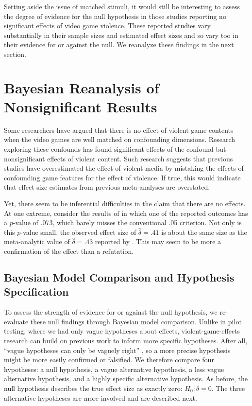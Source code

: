 \documentclass[man]{apa6}
\begin{document}
Setting aside the issue of matched stimuli, it would still be interesting to assess the degree of evidence for the null hypothesis in those studies reporting no significant effects of video game violence. These reported studies vary substantially in their sample sizes and estimated effect sizes and so vary too in their evidence for or against the null. We reanalyze these findings in the next section.

\section{Bayesian Reanalysis of Nonsignificant Results}
Some researchers have argued that there is no effect of violent game contents when the video games are well matched on confounding dimensions. Research exploring these confounds has found significant effects of the confound but nonsignificant effects of violent content. Such research suggests that previous studies have overestimated the effect of violent media by mistaking the effects of confounding game features for the effect of violence. If true, this would indicate that effect size estimates from previous meta-analyses \citep[e.g., $r = .21$ or $d = 0.43$,][]{Anderson:etal:2010} are overstated.  

Yet, there seem to be inferential difficulties in the claim that there are no effects.  At one extreme, consider the results of \citet{Elson:etal:2013} in which one of the reported outcomes has a $p$-value of .073, which barely misses the conventional .05 criterion.  Not only is this $p$-value small, the observed effect size of $\hat{\delta}=.41$ is about the same size as the meta-analytic value of $\hat{\delta}=.43$ reported by \citet{Anderson:etal:2010}.  This may seem to be more a confirmation of the effect than a refutation.

\subsection{Bayesian Model Comparison and Hypothesis Specification}
To assess the strength of evidence for or against the null hypothesis, we re-evaluate these null findings through Bayesian model comparison. Unlike in pilot testing, where we had only vague hypotheses about effects, violent-game-effects research can build on previous work to inform more specific hypotheses. After all, ``vague hypotheses can only be vaguely right'' \citep[p. 4]{Gallistel:2009}, so a more precise hypothesis might be more easily confirmed or falsified. We therefore compare four hypotheses: a null hypothesis, a vague alternative hypothesis, a less vague alternative hypothesis, and a highly specific alternative hypothesis. As before, the null hypothesis describes the true effect size as exactly zero: $H_0: \delta = 0$. The three alternative hypotheses are more involved and are described next. 
\end{document}
